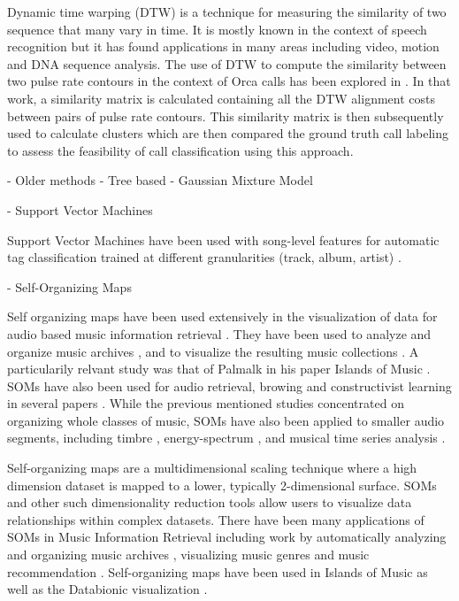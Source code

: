 \documentclass[12pt,oneside]{book}
\begin{document}
Dynamic time warping (DTW) is a technique for measuring the similarity
of two sequence that many vary in time. It is mostly known in the context
of speech recognition \cite{sakoe78} but it has found applications in
many areas including video, motion and DNA sequence analysis. The use
of DTW to compute the similarity between two pulse rate contours in
the context of Orca calls has been explored in
\cite{brown07_orca_dtw}. In that work, a similarity matrix is
calculated containing all the DTW alignment costs between pairs of
pulse rate contours. This similarity matrix is then subsequently used
to calculate clusters which are then compared the ground truth call
labeling to assess the feasibility of call classification using this
approach.  

- Older methods
	- Tree based
	- Gaussian Mixture Model

- Support Vector Machines

Support Vector Machines have been used with song-level features for
automatic tag classification trained at different granularities
(track, album, artist) \cite{mandel-ismir2008}.

- Self-Organizing Maps

Self organizing maps have been used extensively in the visualization
of data for audio based music information retrieval \cite{cooper06}.
They have been used to analyze and organize music archives
\cite{rauber01a} \cite{rauber98a} \cite{rauber98b} \cite{rauber02a},
and to visualize the resulting music collections \cite{rauber03a}
\cite{pampalk04} \cite{rauber02}.  A particularily relvant study was
that of Palmalk in his paper Islands of Music \cite{pampalk03}.  SOMs
have also been used for audio retrieval, browing and constructivist
learning in several papers \cite{cano02} \cite{fruehwirth01}
\cite{honkela00}.  While the previous mentioned studies concentrated
on organizing whole classes of music, SOMs have also been applied to
smaller audio segments, including timbre \cite{toirvainen97},
energy-spectrum \cite{masugi04}, and musical time series analysis
\cite{capinteiro98}.

Self-organizing maps \cite{kohonen95a} are a multidimensional scaling
technique where a high dimension dataset is mapped to a lower,
typically 2-dimensional surface. SOMs and other such dimensionality
reduction tools allow users to visualize data relationships within
complex datasets.  There have been many applications of SOMs in Music
Information Retrieval including work by automatically analyzing and
organizing music archives \cite{rauber01a} \cite{rauber98b},
visualizing music genres \cite{pampalk03}\cite{pampalk03} and music
recommendation \cite{vembu05a}.  Self-organizing maps have been used
in Islands of Music \cite{RPM02} as well as the Databionic
visualization \cite{MUN05}.
\end{document}

